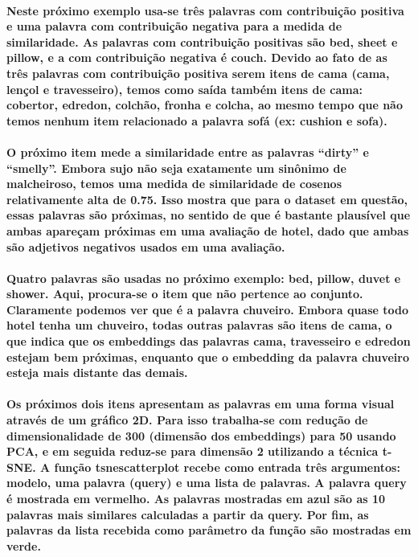 \documentclass[a4paper]{article}    %
\begin{document}
\paragraph{Neste próximo exemplo usa-se três palavras com contribuição positiva e uma palavra com contribuição negativa para a medida de similaridade. As palavras com contribuição positivas são bed, sheet e pillow, e a com contribuição negativa é couch. Devido ao fato de as três palavras com contribuição positiva serem itens de cama (cama, lençol e travesseiro), temos como saída também itens de cama: cobertor, edredon, colchão, fronha e colcha, ao mesmo tempo que não temos nenhum item relacionado a palavra sofá (ex: cushion e sofa).}

\paragraph{O próximo item mede a similaridade entre as palavras ``dirty'' e ``smelly''. Embora sujo não seja exatamente um sinônimo de malcheiroso, temos uma medida de similaridade de cosenos relativamente alta de 0.75. Isso mostra que para o dataset em questão, essas palavras são próximas, no sentido de que é bastante plausível que ambas apareçam próximas em uma avaliação de hotel, dado que ambas são adjetivos negativos usados em uma avaliação.}

\paragraph{Quatro palavras são usadas no próximo exemplo: bed, pillow, duvet e shower. Aqui, procura-se o item que não pertence ao conjunto. Claramente podemos ver que é a palavra chuveiro. Embora quase todo hotel tenha um chuveiro, todas outras palavras são itens de cama, o que indica que os embeddings das palavras cama, travesseiro e edredon estejam bem próximas, enquanto que o embedding da palavra chuveiro esteja mais distante das demais.}

\paragraph{Os próximos dois itens apresentam as palavras em uma forma visual através de um gráfico 2D. Para isso trabalha-se com redução de dimensionalidade de 300 (dimensão dos embeddings) para 50 usando PCA, e em seguida reduz-se para dimensão 2 utilizando a técnica t-SNE. A função tsnescatterplot recebe como entrada três argumentos: modelo, uma palavra (query) e uma lista de palavras. A palavra query é mostrada em vermelho. As palavras mostradas em azul são as 10 palavras mais similares calculadas a partir da query. Por fim, as palavras da lista recebida como parâmetro da função são mostradas em verde.}
\end{document}
